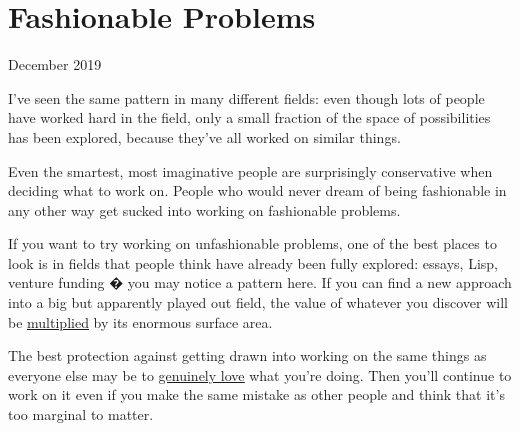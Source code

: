 \chapter{Fashionable Problems}


            
              
                

December 2019

I've seen the same pattern in many
                  different fields: even though lots of people have worked hard
                  in the field, only a small fraction of the space of
                  possibilities has been explored, because they've all worked on
                  similar things.

Even the smartest, most imaginative
                  people are surprisingly conservative when deciding what to
                  work on. People who would never dream of being fashionable in
                  any other way get sucked into working on fashionable
                  problems.

If you want to try working on
                  unfashionable problems, one of the best places to look is in
                  fields that people think have already been fully explored:
                  essays, Lisp, venture funding � you may notice a pattern here.
                  If you can find a new approach into a big but apparently
                  played out field, the value of whatever you discover will be
                  \href{http://www.paulgraham.com/sun.html}{\underline{multiplied}} by its enormous
                  surface area.

The best protection against getting
                  drawn into working on the same things as everyone else may be
                  to \href{http://www.paulgraham.com/genius.html}{\underline{genuinely love}} what you're
                  doing. Then you'll continue to work on it even if you make the
                  same mistake as other people and think that it's too marginal
                  to matter.


              
            
          
